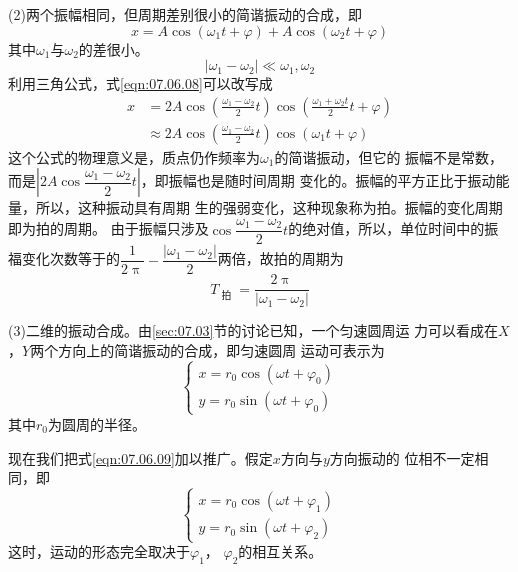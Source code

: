 (2)两个振幅相同，但周期差别很小的简谐振动的合成，即
\begin{equation}\label{eqn:07.06.08}
    x = A \cos ( \omega _ { 1 } t + \varphi ) + A  \cos ( \omega _ { 2 } t + \varphi )
\end{equation}
其中$\omega_{ 1 }$与$\omega_{ 2 }$的差很小。
\begin{equation*}
    | \omega _ { 1 } - \omega _ { 2 } | \ll \omega _ { 1 } , \omega _ { 2 }
\end{equation*}
利用三角公式，式\eqref{eqn:07.06.08}可以改写成
\begin{equation*}
    \begin{split}
        x &= 2 A  \cos \left( \frac { \omega _ { 1 } - \omega _ { 2 } } { 2 } t \right)  \cos \left( \frac { \omega _ { 1 } + \omega _ { 2 } t } { 2 } t  + \varphi \right)  \\
        & \approx 2 A  \cos \left( \frac { \omega _ { 1 } - \omega _ { 2 } } { 2 } t \right)  \cos ( \omega _ { 1 } t + \varphi )
    \end{split}
\end{equation*}
这个公式的物理意义是，质点仍作频率为$\omega_{ 1 }$的简谐振动，但它的
振幅不是常数，而是$ \left| 2 A  \cos \dfrac { \omega _ { 1 } - \omega _ { 2 } } { 2 } t \right| $，即振幅也是随时间周期
变化的。振幅的平方正比于振动能量，所以，这种振动具有周期
生的强弱变化，这种现象称为拍。振幅的变化周期即为拍的周期。
由于振幅只涉及$ \cos \dfrac { \omega _ { 1 } - \omega _ { 2 } } { 2 } t $的绝对值，所以，单位时间中的振
福变化次数等于的$ \dfrac { 1 } { 2 \uppi } - \dfrac { | \omega _ { 1 } - \omega _ { 2 } | } { 2 } $两倍，故拍的周期为
\begin{equation*}
    T _ { \text { 拍 } } = \frac { 2 \uppi } { | \omega _ { 1 } - \omega _ { 2 } | }
\end{equation*}

(3)二维的振动合成。由\ref{sec:07.03}节的讨论已知，一个匀速圆周运
力可以看成在$ X $，$ Y $两个方向上的简谐振动的合成，即匀速圆周
运动可表示为
\begin{equation}\label{eqn:07.06.09}
    \begin{cases}
        x = r _ { 0 } \cos ( \omega t + \varphi _ { 0 } ) \\
        y = r _ { 0 } \sin ( \omega t + \varphi _ { 0 } )
    \end{cases}
\end{equation}
其中$ r _ { 0 } $为圆周的半径。

现在我们把式\eqref{eqn:07.06.09}加以推广。假定$ x $方向与$ y $方向振动的
位相不一定相同，即
\begin{equation}\label{eqn:07.06.10}
    \begin{cases}
        x = r _ { 0 } \cos ( \omega t + \varphi _ { 1 } ) \\
        y = r _ { 0 } \sin ( \omega t + \varphi _ { 2 } )
    \end{cases}
\end{equation}
这时，运动的形态完全取决于$  \varphi _ { 1 }   $， $ \varphi _ { 2 }   $的相互关系。

